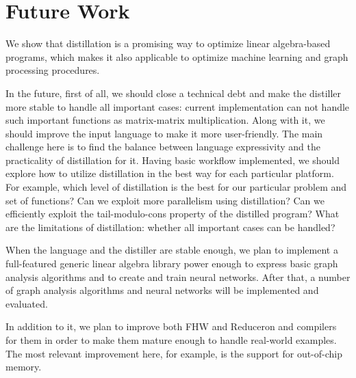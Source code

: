 \section{Future Work}

We show that distillation is a promising way to optimize linear algebra-based programs, which makes it also applicable to optimize machine learning and graph processing procedures.

In the future, first of all, we should close a technical debt and make the distiller more stable to handle all important cases: current implementation can not handle such important functions as matrix-matrix multiplication.
Along with it, we should improve the input language to make it more user-friendly.
The main challenge here is to find the balance between language expressivity and the practicality of distillation for it.
Having basic workflow implemented, we should explore how to utilize distillation in the best way for each particular platform. 
For example, which level of distillation is the best for our particular problem and set of functions?
Can we exploit more parallelism using distillation?
Can we efficiently exploit the tail-modulo-cons property of the distilled program?
What are the limitations of distillation: whether all important cases can be handled?

When the language and the distiller are stable enough, we plan to implement a full-featured generic linear algebra library power enough to express basic graph analysis algorithms and to create and train neural networks.
After that, a number of graph analysis algorithms and neural networks will be implemented and evaluated.

In addition to it, we plan to improve both FHW and Reduceron and compilers for them in order to make them mature enough to handle real-world examples.
The most relevant improvement here, for example, is the support for out-of-chip memory.